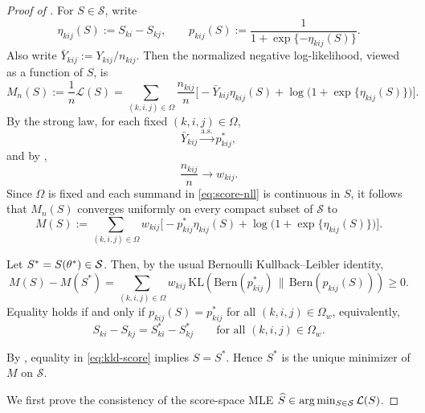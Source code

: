 \documentclass{article}
\begin{document}
\begin{bibunit}[unsrtnat]
\begin{proof}[Proof of ]\label{pf:asymptotics}
For $S\in\mathcal S$, write
\[
\eta_{kij}(S):=S_{ki}-S_{kj},
\qquad
p_{kij}(S):=\frac{1}{1+\exp\{-\eta_{kij}(S)\}}.
\]
Also write $\bar Y_{kij}:=Y_{kij}/n_{kij}$. Then the normalized negative log-likelihood, viewed as a function of $S$, is
\begin{equation}\label{eq:score-nll}
M_n(S):=\frac1n\mathcal L(S)
=
\sum_{(k,i,j)\in\Omega}\frac{n_{kij}}{n}
\Big[
-\bar Y_{kij}\eta_{kij}(S)+\log\bigl(1+\exp\{\eta_{kij}(S)\}\bigr)
\Big].
\end{equation}
By the strong law, for each fixed $(k,i,j)\in\Omega$,
\[
\bar Y_{kij}\xrightarrow{\mathrm{a.s.}} p_{kij}^\ast,
\]
and by ,
\[
\frac{n_{kij}}{n}\to w_{kij}.
\]
Since $\Omega$ is fixed and each summand in \eqref{eq:score-nll} is continuous in $S$, it follows that $M_n(S)$ converges uniformly on every compact subset of $\mathcal S$ to
\begin{equation}\label{eq:population-score-criterion}
M(S)
:=
\sum_{(k,i,j)\in\Omega}
w_{kij}
\Big[
-p_{kij}^\ast\eta_{kij}(S)+\log\bigl(1+\exp\{\eta_{kij}(S)\}\bigr)
\Big].
\end{equation}

Let $S^\ast=S(\theta^\ast)\in{\mathcal{S}}$. Then, by the usual Bernoulli Kullback--Leibler identity,
\begin{equation}\label{eq:kld-score}
M(S)-M(S^\ast)
=
\sum_{(k,i,j)\in\Omega}
w_{kij}\,
\mathrm{KL}\!\left(
\mathrm{Bern}(p_{kij}^\ast)\,\|\,\mathrm{Bern}(p_{kij}(S))
\right)\ge 0.
\end{equation}
Equality holds if and only if $p_{kij}(S)=p_{kij}^\ast$ for all $(k,i,j)\in\Omega_w$, equivalently,
\[
S_{ki}-S_{kj}=S^\ast_{ki}-S^\ast_{kj}
\qquad\text{for all }(k,i,j)\in\Omega_w.
\]

By , equality in \eqref{eq:kld-score} implies $S=S^\ast$. Hence $S^\ast$ is the unique minimizer of $M$ on $\mathcal S$.


We first prove the consistency of the score-space MLE $\widehat S\in\arg\min_{S\in{\mathcal{S}}}\mathcal L(S)$.


\end{proof}
\end{bibunit}
\end{document}
